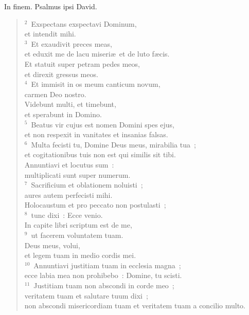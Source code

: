 \bchapter
\lettrine[lines=3,image=true,loversize=0.05,lraise=-0.03]{I}{}n finem. Psalmus ipsi David.
\begin{flushleft}\begin{verse}\vspace{6pt}${}^{2}$~Exspectans exspectavi Dominum,\\ et intendit mihi.\\
${}^{3}$~Et exaudivit preces meas,\\ et eduxit me de lacu miseri\ae\ et de luto f\ae cis.\\ Et statuit super petram pedes meos,\\ et direxit gressus meos.\\
${}^{4}$~Et immisit in os meum canticum novum,\\ carmen Deo nostro.\\ Videbunt multi, et timebunt,\\ et sperabunt in Domino.\\
${}^{5}$~Beatus vir cujus est nomen Domini spes ejus,\\ et non respexit in vanitates et insanias falsas.\\
${}^{6}$~Multa fecisti tu, Domine Deus meus, mirabilia tua~;\\ et cogitationibus tuis non est qui similis sit tibi.\\ Annuntiavi et locutus sum~:\\ multiplicati sunt super numerum.\\
${}^{7}$~Sacrificium et oblationem noluisti~;\\ aures autem perfecisti mihi.\\ Holocaustum et pro peccato non postulasti~;\\
${}^{8}$~tunc dixi~: Ecce venio.\\ In capite libri scriptum est de me,\\
${}^{9}$~ut facerem voluntatem tuam.\\ Deus meus, volui,\\ et legem tuam in medio cordis mei.\\
${}^{10}$~Annuntiavi justitiam tuam in ecclesia magna~;\\ ecce labia mea non prohibebo~: Domine, tu scisti.\\
${}^{11}$~Justitiam tuam non abscondi in corde meo~;\\ veritatem tuam et salutare tuum dixi~;\\ non abscondi misericordiam tuam et veritatem tuam a concilio multo.\\

\end{verse}
\end{flushleft}
